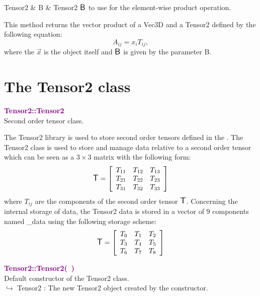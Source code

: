 \begin{tcolorbox}[width=\textwidth,myArgs,tabularx={ll|R}]
Tensor2 & B & Tensor2 $\mbox{\large\ensuremath{\mathsf{B}}}$ to use for the element-wise product operation.
\end{tcolorbox}

This method returns the vector product of a Vec3D and a Tensor2 defined by the following equation:
\begin{equation*}
A_{ij} = x_i T_{ij},
\end{equation*}
where the $\overrightarrow{x}$ is the object itself and $\mbox{\large\ensuremath{\mathsf{B}}}$ is given by the parameter B.

\section{The Tensor2 class}

\textcolor{purple}{\textbf{Tensor2::Tensor2}}\label{Tensor2::Tensor2}\\
Second order tensor class.

The Tensor2 library is used to store second order tensors defined in the \DynELA.
The Tensor2 class is used to store and manage data relative to a second order tensor which can be seen as a $3\times3$ matrix with the following form:
\begin{equation*}
\mbox{\large\ensuremath{\mathsf{T}}}=\left[\begin{array}{ccc}
  T_{11} & T_{12} & T_{13}\\
  T_{21} & T_{22} & T_{23}\\
  T_{31} & T_{32} & T_{33}
  \end{array}\right]
\end{equation*}
where $T_{ij}$ are the components of the second order tensor $\mbox{\large\ensuremath{\mathsf{T}}}$.
Concerning the internal storage of data, the Tensor2 data is stored in a vector of $9$ components named \textsf{\_data} using the following storage scheme:
\begin{equation*}
\mbox{\large\ensuremath{\mathsf{T}}}=\left[\begin{array}{ccc}
    T_{0} & T_{1} & T_{2}\\
    T_{3} & T_{4} & T_{5}\\
    T_{6} & T_{7} & T_{8}
    \end{array}\right]
\end{equation*}

\textcolor{purple}{\textbf{Tensor2::Tensor2(~)}}\label{Tensor2::Tensor2()}\\
Default constructor of the Tensor2 class.\\ \hspace*{10mm}$\hookrightarrow$ Tensor2 : The new Tensor2 object created by the constructor.

